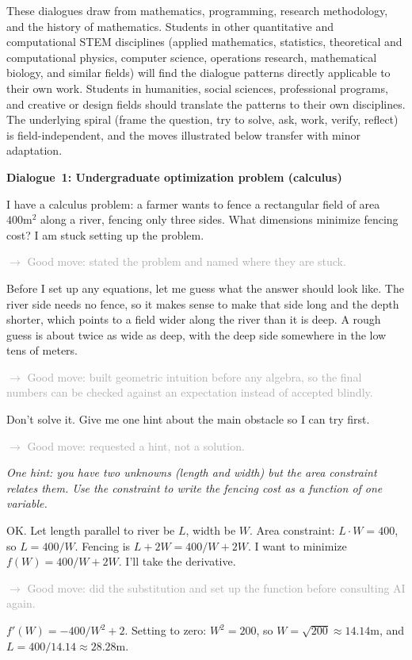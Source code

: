 \documentclass{SIAMbook2023}
\newenvironment{dialogue}[1]%
  {\par\medskip\noindent\textbf{\textcolor{guideblue}{#1}}\par\smallskip
   \begin{list}{}{\setlength{\leftmargin}{1.5em}\setlength{\rightmargin}{0.5em}\setlength{\itemsep}{0.4em}\setlength{\topsep}{0pt}}}
  {\end{list}\par\medskip}
\newcommand{\studentturn}[1]{\item[\textbf{Student.}] #1}
\newcommand{\aiturn}[1]{\item[\textbf{AI.}] \textit{#1}}
\newcommand{\dialogueannotate}[1]{\par\smallskip\hspace{2em}\textcolor{darkgray}{\footnotesize\textsf{$\rightarrow$ #1}}\par}
\begin{document}
These dialogues draw from mathematics, programming, research methodology, and the history of mathematics. Students in other quantitative and computational STEM disciplines (applied mathematics, statistics, theoretical and computational physics, computer science, operations research, mathematical biology, and similar fields) will find the dialogue patterns directly applicable to their own work. Students in humanities, social sciences, professional programs, and creative or design fields should translate the patterns to their own disciplines. The underlying spiral (frame the question, try to solve, ask, work, verify, reflect) is field-independent, and the moves illustrated below transfer with minor adaptation.

\begin{dialogue}{Dialogue~1: Undergraduate optimization problem (calculus)}
\studentturn{I have a calculus problem: a farmer wants to fence a rectangular field of area $400 \text{m}^2$ along a river, fencing only three sides. What dimensions minimize fencing cost? I am stuck setting up the problem.}
\dialogueannotate{Good move: stated the problem and named where they are stuck.}

\studentturn{Before I set up any equations, let me guess what the answer should look like. The river side needs no fence, so it makes sense to make that side long and the depth shorter, which points to a field wider along the river than it is deep. A rough guess is about twice as wide as deep, with the deep side somewhere in the low tens of meters.}
\dialogueannotate{Good move: built geometric intuition before any algebra, so the final numbers can be checked against an expectation instead of accepted blindly.}

\studentturn{Don't solve it. Give me one hint about the main obstacle so I can try first.}
\dialogueannotate{Good move: requested a hint, not a solution.}

\aiturn{One hint: you have two unknowns (length and width) but the area constraint relates them. Use the constraint to write the fencing cost as a function of one variable.}

\studentturn{OK. Let length parallel to river be $L$, width be $W$. Area constraint: $L \cdot W = 400$, so $L = 400/W$. Fencing is $L + 2W = 400/W + 2W$. I want to minimize $f(W) = 400/W + 2W$. I'll take the derivative.}
\dialogueannotate{Good move: did the substitution and set up the function before consulting AI again.}

\studentturn{$f'(W) = -400/W^2 + 2$. Setting to zero: $W^2 = 200$, so $W = \sqrt{200} \approx 14.14\text{m}$, and $L = 400/14.14 \approx 28.28\text{m}$.}


\end{dialogue}
\end{document}
